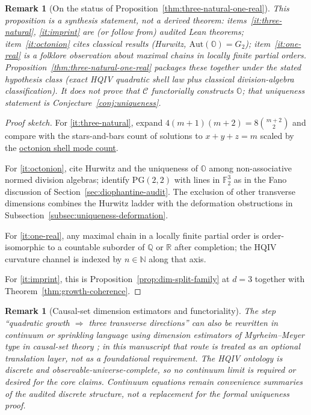 \documentclass[11pt]{amsart}
\newtheorem{remark}[theorem]{Remark}
\begin{document}
\begin{remark}[On the status of Proposition~\ref{thm:three-natural-one-real}]
This proposition is a \emph{synthesis statement}, not a derived theorem: items~\eqref{it:three-natural}, \eqref{it:imprint} are (or follow from) audited Lean theorems; item~\eqref{it:octonion} cites classical results (Hurwitz, \(\mathrm{Aut}(\mathbb{O})=G_2\)); item~\eqref{it:one-real} is a folklore observation about maximal chains in locally finite partial orders. Proposition~\ref{thm:three-natural-one-real} packages these together under the \emph{stated hypothesis class} (exact HQIV quadratic shell law plus classical division-algebra classification). It does \emph{not} prove that \(\mathcal{C}\) functorially constructs \(\mathbb{O}\); that uniqueness statement is Conjecture~\ref{conj:uniqueness}.
\end{remark}

\begin{proof}[Proof sketch]
For \eqref{it:three-natural}, expand \(4(m+1)(m+2)=8\binom{m+2}{2}\) and compare with the stars-and-bars count of solutions to \(x+y+z=m\) scaled by the \hyperref[lean:available-modes]{octonion shell mode count}.

For \eqref{it:octonion}, cite Hurwitz and the uniqueness of \(\mathbb{O}\) among non-associative normed division algebras; identify \(\mathrm{PG}(2,2)\) with lines in \(\mathbb{F}_2^3\) as in the Fano discussion of Section~\ref{sec:diophantine-audit}. The exclusion of other transverse dimensions combines the Hurwitz ladder with the deformation obstructions in Subsection~\ref{subsec:uniqueness-deformation}.

For \eqref{it:one-real}, any maximal chain in a locally finite partial order is order-isomorphic to a countable suborder of \(\mathbb{Q}\) or \(\mathbb{R}\) after completion; the HQIV curvature channel is indexed by \(n\in\mathbb{N}\) along that axis.

For \eqref{it:imprint}, this is Proposition~\ref{prop:dim-split-family} at \(d=3\) together with Theorem~\ref{thm:growth-coherence}.
\end{proof}

\begin{remark}[Causal-set dimension estimators and functoriality]
\label{rem:three-natural-one-real-status}
The step ``quadratic growth \(\Rightarrow\) three transverse directions'' can also be rewritten in continuum or sprinkling language using dimension estimators of Myrheim--Meyer type in causal-set theory \cite{bombelli1987,Sorkin2005}; in this manuscript that route is treated as an optional translation layer, not as a foundational requirement. The HQIV ontology is discrete and observable-universe-complete, so no continuum limit is required or desired for the core claims. Continuum equations remain convenience summaries of the audited discrete structure, not a replacement for the formal uniqueness proof.
\end{remark}
\end{document}
